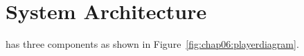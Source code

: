 \section{System Architecture}
\label{sec:chap06:systemDesign}
{\our} has three components as shown in Figure~\ref{fig:chap06:playerdiagram}.

